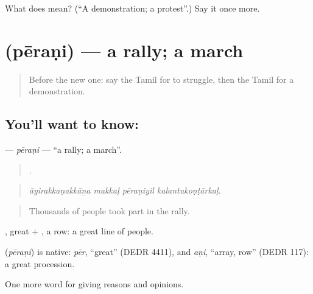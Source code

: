 \begin{tcolorbox}[breakable,colback=teal!4,colframe=teal!35!black,title={Before you move on}]
What does  mean? (\textquotedblleft{}A demonstration; a protest\textquotedblright{}.) Say it once more.
\end{tcolorbox}
\section[\texorpdfstring{\ta{பேரணி} (pēraṇi)}{பேரணி (pēraṇi)}]{ (pēraṇi) — a rally; a march}

\label{lesson:TA-C376-perani}



\begin{quote}
Before the new one: say the Tamil for to struggle, then the Tamil for a demonstration.
\end{quote}

\subsection*{You'll want to know: }
\textbf{} — \emph{pēraṇi} — \textquotedblleft{}a rally; a march\textquotedblright{}.

\begin{quote}
   .
\end{quote}

\begin{quote}
\emph{āyirakkaṇakkāṉa makkaḷ pēraṇiyil kalantukoṇṭārkaḷ.}
\end{quote}

\begin{quote}
Thousands of people took part in the rally.
\end{quote}

, great + , a row: a great line of people.

\begin{cousinweb}
\textbf{} (\emph{pēraṇi}) is native: \emph{pēr}, \textquotedblleft{}great\textquotedblright{} (DEDR 4411), and \emph{aṇi}, \textquotedblleft{}array, row\textquotedblright{} (DEDR 117): a great procession.
\end{cousinweb}

\begin{grammarlens}[title={What you've built}]
One more word for giving reasons and opinions.
\end{grammarlens}


